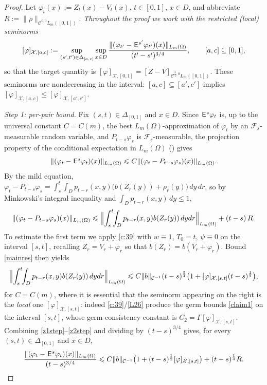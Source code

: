 \documentclass[12pt]{article}
\theoremstyle{definition}
\DeclareMathOperator{\1}{\mathbbm{1}}%
\def\E{\hskip.15ex\mathsf{E}\hskip.10ex}
\def\phi{\varphi}
\renewcommand{\le}{\leqslant}
\newcommand{\C}{\mathcal{C}}
\newcommand{\F}{\mathcal{F}}
\newcommand{\X}{\mathcal{X}}
\begin{document}
\begin{proof}
Let $\phi_t(x):=Z_t(x)-V_t(x)$, $t\in[0,1]$, $x\in D$, and abbreviate
$R:=\|\rho\|_{\C^{0,0}L_m([0,1])}$. \emph{Throughout the proof we work with the
restricted (local) seminorms}
\[
[\phi]_{\X,[a,c]}:=\sup_{(s',t')\in\Delta_{[a,c]}}\sup_{x\in D}
\frac{\|(\phi_{t'}-\E^{s'}\phi_{t'})(x)\|_{L_m(\Omega)}}{(t'-s')^{3/4}},
\qquad [a,c]\subseteq[0,1],
\]
so that the target quantity is $[\phi]_{\X,[0,1]}=[Z-V]_{\C^{\frac34,0}L_m([0,1])}$.
These seminorms are nondecreasing in the interval: $[a,c]\subseteq[a',c']$ implies
$[\phi]_{\X,[a,c]}\le[\phi]_{\X,[a',c']}$.

\smallskip
\emph{Step 1: per-pair bound.}
Fix $(s,t)\in\Delta_{[0,1]}$ and $x\in D$. Since $\E^s\phi_t$ is, up to the universal
constant $C=C(m)$, the best $L_m(\Omega)$-approximation of $\phi_t$ by an
$\F_s$-measurable random variable, and $P_{t-s}\phi_s$ is $\F_s$-measurable, the
projection property of the conditional expectation in $L_m(\Omega)$
(\cite[Lemma~4.2(i)]{BDGLevy}) gives
\begin{equation}\label{z1step} 	
\|(\phi_t-\E^s \phi_t)(x)\|_{L_m(\Omega)}\le C \|(\phi_t-P_{t-s}\phi_s)(x)\|_{L_m(\Omega)} .
\end{equation}
By the mild equation, $\phi_t-P_{t-s}\phi_s=\int_s^t\int_D p_{t-r}(x,y)\bigl(b(Z_r(y))+\rho_r(y)\bigr)\,dy\,dr$,
so by Minkowski's integral inequality and $\int_Dp_{t-r}(x,y)\,dy\le1$,
\begin{equation}\label{z1bis}
\|(\phi_t-P_{t-s}\phi_s)(x)\|_{L_m(\Omega)}
\le \Bigl\|\int_s^t\!\!\int_D p_{t-r}(x,y) b(Z_r(y))\,dydr\Bigr\|_{L_m(\Omega)}+(t-s)\,R .
\end{equation}
To estimate the first term we apply \cref{c:39} with $w\equiv1$, $T_0=t$, $\psi\equiv0$
on the interval $[s,t]$, recalling $Z_r=V_r+\phi_r$ so that $b(Z_r)=b(V_r+\phi_r)$.
Bound \eqref{mainres} then yields
\begin{equation}\label{z2step}
\Bigl\|\int_s^t\!\!\int_D p_{t-r}(x,y) b(Z_r(y))\,dydr\Bigr\|_{L_m(\Omega)}
\le C \|b\|_{\C^{-1}} (t-s)^{\frac34}\bigl(1+[\phi]_{\X,[s,t]}(t-s)^{\frac12}\bigr),
\end{equation}
for $C=C(m)$, where it is essential that the seminorm appearing on the right is the
\emph{local} one $[\phi]_{\X,[s,t]}$: indeed \cref{c:39}/\cref{L26} produce the germ
bounds \eqref{claim1} on the interval $[s,t]$, whose germ-consistency constant is
$C_2=\Gamma[\phi]_{\X,[s,t]}$. Combining \eqref{z1step}--\eqref{z2step} and dividing by
$(t-s)^{3/4}$ gives, for every $(s,t)\in\Delta_{[0,1]}$ and $x\in D$,
\begin{equation}\label{perpair}
\frac{\|(\phi_t-\E^s\phi_t)(x)\|_{L_m(\Omega)}}{(t-s)^{3/4}}
\le C\|b\|_{\C^{-1}}\bigl(1+(t-s)^{\frac12}[\phi]_{\X,[s,t]}\bigr)+(t-s)^{\frac14}R .
\end{equation}


\end{proof}
\end{document}

